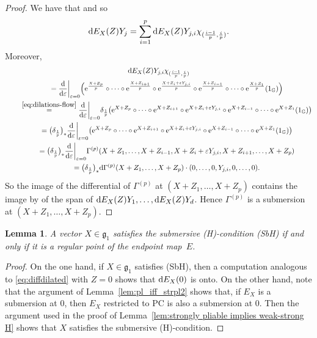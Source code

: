 \documentclass[10pt,a4paper]{amsart}
\numberwithin{equation}{section}
\newtheorem{Lemma}[Theorem]{Lemma}
\theoremstyle{definition}
\begin{document}
\begin{proof}
We have that  and so
 \[{\rm d}E_X(Z)Y_j=\sum_{i=1}^p {\rm d}E_X(Z)Y_{j,i}\chi _{(\frac{i-1}p,\frac ip)}.\]
Moreover,
\begin{gather}
 {\rm d}E_X(Z)Y_{j,i}\chi _{(\frac{i-1}p,\frac ip)}\nonumber\\
 \qquad{}=\frac{{\rm d}}{{\rm d}\varepsilon}\biggr|_{\varepsilon=0}
 \Bigl({\rm e}^{\frac{X+Z_p}p}\circ\dots\circ {\rm e}^{\frac{X+Z_{i+1}}p}\circ {\rm e}^{\frac{X+Z_i+\varepsilon Y_{j,i}}p}\circ {\rm e}^{\frac{X+Z_{i-1}}p}\circ \dots\circ {\rm e}^{\frac{X+Z_1}p}(1_{\mathbb{G}})\Bigr)\nonumber\\
 \qquad{}\stackrel{\eqref{eq:dilations-flow}}{=}\frac{{\rm d}}{{\rm d}\varepsilon}\biggr|_{\varepsilon=0}
 \delta_{\frac1p}\bigl({\rm e}^{X+Z_p}\circ\dots\circ {\rm e}^{X+Z_{i+1}}\circ {\rm e}^{X+Z_i+\varepsilon Y_{j,i}}\circ {\rm e}^{X+Z_{i-1}}\circ \dots\circ {\rm e}^{X+Z_1}(1_{\mathbb{G}})\bigr)\nonumber\\
\qquad{}=\bigl(\delta_{\frac1p}\bigr)_*\frac{{\rm d}}{{\rm d}\varepsilon}\biggr|_{\varepsilon=0}\bigl({\rm e}^{X+Z_p}\circ\dots\circ {\rm e}^{X+Z_{i+1}}\circ {\rm e}^{X+Z_i+\varepsilon Y_{j,i}}\circ {\rm e}^{X+Z_{i-1}}\circ \dots\circ {\rm e}^{X+Z_1}(1_{\mathbb{G}})\bigr)\nonumber\\
 \qquad{}=\bigl(\delta_{\frac1p}\bigr)_*\frac{{\rm d}}{{\rm d}\varepsilon}\biggr|_{\varepsilon=0}
 \Gamma^{(p)}(X+Z_{1},\dots,X+Z_{i-1},X+Z_i+\varepsilon Y_{j,i},X+Z_{i+1}, \dots, X+Z_{p})\nonumber\\
\qquad{}=\bigl(\delta_{\frac1p}\bigr)_* {\rm d}\Gamma^{(p)}(X+Z_1,\dots,X+Z_p)\cdot (0,\dots,0, Y_{j,i},0,\dots,0).\label{eq:diffdilated}
\end{gather}
So
the image of the differential of
$\Gamma^{(p)}$
at $(X\!+\!Z_1,\dots,X\!+\!Z_p)$ contains the image by  of
the
span of ${\rm d}E_X(Z)Y_1,\dots,{\rm d}E_X(Z)Y_d$.
Hence $\Gamma^{(p)}$
is a submersion at $(X\!+\!Z_1,\dots,X\!+\!Z_p)$.
\end{proof}

\begin{Lemma}
\label{le:strong=reg}
A vector $X\in{\mathfrak g}_1$ satisfies the submersive {\rm (H)}-condition {\rm (SbH)}
 if and only if it is a regular point of the endpoint map~$E$.
\end{Lemma}
\begin{proof}
On the one hand, if $X\in{\mathfrak g}_1$ satisfies
(SbH), then a computation analogous to \eqref{eq:diffdilated} with $Z=0$ shows that ${\rm d}E_X(0)$ is onto.
On the other hand,
note that the argument of Lemma~\ref{lem:pl_iff_strpl2} shows that, if $E_X$ is a submersion at $0$, then $E_X$ restricted to PC is also a submersion at $0$. Then the argument used in the proof of Lemma~\ref{lem:strongly pliable implies weak-strong H} shows that $X$ satisfies the submersive (H)-condition.
\end{proof}
\end{document}
